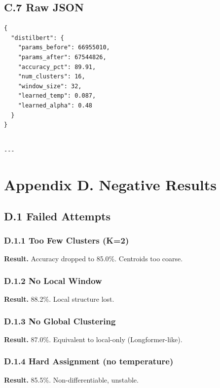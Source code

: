 \subsection{C.7 Raw JSON}

\begin{lstlisting}
{
  "distilbert": {
    "params_before": 66955010,
    "params_after": 67544826,
    "accuracy_pct": 89.91,
    "num_clusters": 16,
    "window_size": 32,
    "learned_temp": 0.087,
    "learned_alpha": 0.48
  }
}
\end{lstlisting}
\begin{lstlisting}

---
\end{lstlisting}

\section{Appendix D. Negative Results}

\subsection{D.1 Failed Attempts}

\subsubsection{D.1.1 Too Few Clusters (K=2)}

\textbf{Result.} Accuracy dropped to 85.0\%. Centroids too coarse.

\subsubsection{D.1.2 No Local Window}

\textbf{Result.} 88.2\%. Local structure lost.

\subsubsection{D.1.3 No Global Clustering}

\textbf{Result.} 87.0\%. Equivalent to local-only (Longformer-like).

\subsubsection{D.1.4 Hard Assignment (no temperature)}

\textbf{Result.} 85.5\%. Non-differentiable, unstable.

